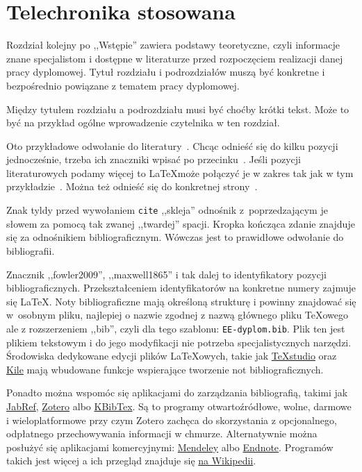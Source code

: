 \chapter{Telechronika stosowana}

Rozdział kolejny po ,,Wstępie'' zawiera podstawy teoretyczne, czyli informacje znane specjalistom i dostępne w literaturze przed rozpoczęciem realizacji danej pracy dyplomowej. Tytuł rozdziału i podrozdziałów muszą być konkretne i bezpośrednio powiązane z tematem pracy dyplomowej.

Między tytułem rozdziału a podrozdziału musi być choćby krótki tekst. Może to być na przykład ogólne wprowadzenie czytelnika w ten rozdział.

Oto przykładowe odwołanie do literatury~\cite{fowler2009}. Chcąc odnieść się do kilku pozycji jednocześnie, trzeba ich znaczniki wpisać po przecinku~\cite{maxwell1865,leksinski1995}. Jeśli pozycji literaturowych podamy więcej to \LaTeX może połączyć je w zakres tak jak w tym przykładzie~\cite{fowler2009, maxwell1865, leksinski1995}. Można też odnieść się do konkretnej strony~\cite[s.~38]{leksinski1995}. 

Znak tyldy przed wywołaniem \texttt{cite} ,,skleja'' odnośnik z~poprzedzającym je słowem za pomocą tak zwanej ,,twardej'' spacji. Kropka kończąca zdanie znajduje się za odnośnikiem bibliograficznym. Wówczas jest to prawidłowe odwołanie do bibliografii.

Znacznik ,,fowler2009'', ,,maxwell1865'' i tak dalej to identyfikatory pozycji bibliograficznych. Przekształceniem identyfikatorów na konkretne numery zajmuje się \LaTeX{}. Noty bibliograficzne mają określoną strukturę i powinny znajdować się w~osobnym pliku, najlepiej o nazwie zgodnej z nazwą głównego pliku \TeX{owego} ale z rozszerzeniem ,,bib'', czyli dla tego szablonu: \texttt{EE-dyplom.bib}. Plik ten jest plikiem tekstowym i do jego modyfikacji nie potrzeba specjalistycznych narzędzi. Środowiska dedykowane edycji plików \LaTeX{owych}, takie jak \href{https://www.texstudio.org/}{TeXstudio} oraz \href{https://kile.sourceforge.io/}{Kile} mają wbudowane funkcje wspierające tworzenie not bibliograficznych.

Ponadto można wspomóc się aplikacjami do zarządzania bibliografią, takimi jak \href{https://www.jabref.org/}{JabRef}, \href{https://www.zotero.org/}{Zotero} albo \href{https://userbase.kde.org/KBibTeX}{KBibTex}. Są to programy otwartoźródłowe, wolne, darmowe i wieloplatformowe przy czym Zotero zachęca do skorzystania z opcjonalnego, odpłatnego przechowywania informacji w chmurze. Alternatywnie można posłużyć się aplikacjami komercyjnymi: \href{https://www.mendeley.com/}{Mendeley} albo \href{https://endnote.com/}{Endnote}. Programów takich jest więcej a ich przegląd znajduje się \href{https://en.wikipedia.org/wiki/Comparison_of_reference_management_software}{na Wikipedii}.

